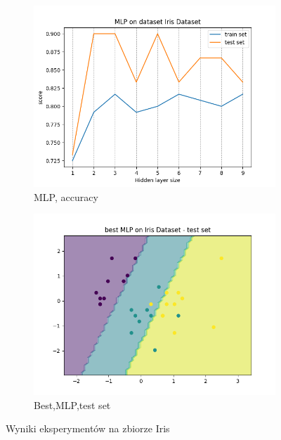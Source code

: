 \documentclass[12pt]{article}
\newcommand*{\subfigwidth}{0.24\textwidth}
\begin{document}
\begin{figure}[H]
\begin{subfigure}[t]{\subfigwidth}
        \includegraphics[width=\linewidth]{img/other_datasets/mlp/iris_accuracy.png}
        \caption{MLP, accuracy}
    \end{subfigure}
    \hfill
    \begin{subfigure}[t]{\subfigwidth}
        \includegraphics[width=\linewidth]{img/other_datasets/mlp/iris_best_boundary_test.png}
        \caption{Best,MLP,test set}
    \end{subfigure}
    \caption{Wyniki eksperymentów na zbiorze Iris}
\end{figure}
\end{document}
